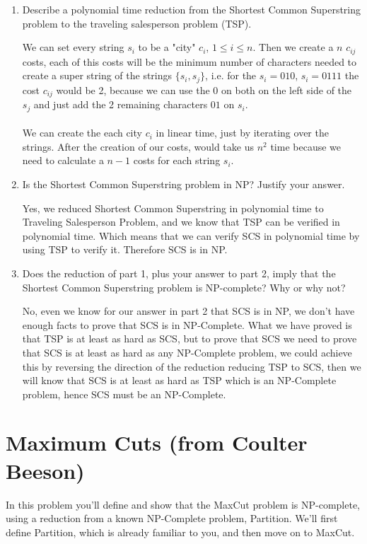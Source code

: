 \documentclass[11pt]{article}
\def\question#1{\red{#1}}
\def\soln#1{\par\blu{#1}} %
\def\blu#1{{\color{blu}#1}}
\def\red#1{{\color{red}#1}}
\begin{document}
\begin{enumerate}
\item \question{Describe a polynomial time reduction from the Shortest Common
Superstring problem to the traveling salesperson problem (TSP).}
\soln{
   We can set every string $s_i$ to be a "city" $c_i$, $1 \le i \le n$.
   Then we create a $n$ $c_{ij}$ costs, each of this costs will be 
   the minimum number of characters needed to create a super string 
   of the strings $\{s_i, s_j\}$, i.e. for the $s_i = 010$, $s_i = 0111$ 
   the cost $c_{ij}$ would be 2, because we can use the 0 on both on the 
   left side of the $s_j$ and just add the 2 remaining characters $01$ on 
   $s_i$. \\ \\
   We can create the each city $c_i$ in linear time, just by iterating 
   over the strings. After the creation of our costs, would take us $n^2$
   time because we need to calculate a $n-1$ costs for each string $s_i$.
}

\item \question{Is the Shortest Common Superstring problem in NP? Justify your answer.}
\soln{
   Yes, we reduced Shortest Common Superstring in polynomial time to 
   Traveling Salesperson Problem, and we know that TSP can be verified 
   in polynomial time. Which means that we can verify SCS in polynomial time 
   by using TSP to verify it. Therefore SCS is in NP.
}

\item \question{Does the reduction of part 1, plus your answer to part 2, imply
that the Shortest Common Superstring problem is NP-complete?  Why
or why not?}
\soln{
   No, even we know for our answer in part 2 that SCS is in NP, we don't 
   have enough facts to prove that SCS is in NP-Complete. What we have 
   proved is that TSP is at least as hard as SCS, but to prove that 
   SCS we need to prove that SCS is at least as hard as any NP-Complete 
   problem, we could achieve this by reversing the direction of the reduction 
   reducing TSP to SCS, then we will know that SCS is at least as hard as TSP 
   which is an NP-Complete problem, hence SCS must be an NP-Complete.
}
\end{enumerate}

\section{Maximum Cuts (from Coulter Beeson)}
\label{sec-4}
In this problem you'll define and show that the MaxCut problem is
NP-complete, using a reduction from a known NP-Complete problem,
Partition.  We'll first define Partition, which is already familiar to you, 
and then move on to MaxCut.
\end{document}
